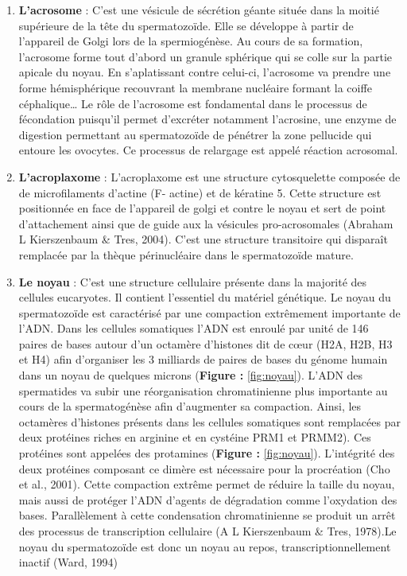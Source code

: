 \documentclass[12pt,twoside]{reedthesis}
\providecommand{\tightlist}{%
  \setlength{\itemsep}{0pt}\setlength{\parskip}{0pt}}
\theoremstyle{definition}
\theoremstyle{definition}
\theoremstyle{remark}
\begin{document}
  \begin{enumerate}
  \def\labelenumi{\arabic{enumi}.}
  \tightlist
  \item
    \textbf{L'acrosome} : C'est une vésicule de sécrétion géante située
    dans la moitié supérieure de la tête du spermatozoïde. Elle se
    développe à partir de l'appareil de Golgi lors de la spermiogénèse. Au
    cours de sa formation, l'acrosome forme tout d'abord un granule
    sphérique qui se colle sur la partie apicale du noyau. En
    s'aplatissant contre celui-ci, l'acrosome va prendre une forme
    hémisphérique recouvrant la membrane nucléaire formant la coiffe
    céphalique\ldots{} Le rôle de l'acrosome est fondamental dans le
    processus de fécondation puisqu'il permet d'excréter notamment
    l'acrosine, une enzyme de digestion permettant au spermatozoïde de
    pénétrer la zone pellucide qui entoure les ovocytes. Ce processus de
    relargage est appelé réaction acrosomal.\\
  \item
    \textbf{L'acroplaxome} : L'acroplaxome est une structure cytosquelette
    composée de de microfilaments d'actine (F- actine) et de kératine 5.
    Cette structure est positionnée en face de l'appareil de golgi et
    contre le noyau et sert de point d'attachement ainsi que de guide aux
    la vésicules pro-acrosomales (Abraham L Kierszenbaum \& Tres, 2004).
    C'est une structure transitoire qui disparaît remplacée par la thèque
    périnucléaire dans le spermatozoïde mature.\\
  \item
    \textbf{Le noyau} : C'est une structure cellulaire présente dans la
    majorité des cellules eucaryotes. Il contient l'essentiel du matériel
    génétique. Le noyau du spermatozoïde est caractérisé par une
    compaction extrêmement importante de l'ADN. Dans les cellules
    somatiques l'ADN est enroulé par unité de 146 paires de bases autour
    d'un octamère d'histones dit de cœur (H2A, H2B, H3 et H4) afin
    d'organiser les 3 milliards de paires de bases du génome humain dans
    un noyau de quelques microns (\textbf{Figure : }\ref{fig:noyau}).
    L'ADN des spermatides va subir une réorganisation chromatinienne plus
    importante au cours de la spermatogénèse afin d'augmenter sa
    compaction. Ainsi, les octamères d'histones présents dans les cellules
    somatiques sont remplacées par deux protéines riches en arginine et en
    cystéine PRM1 et PRMM2). Ces protéines sont appelées des protamines
    (\textbf{Figure : }\ref{fig:noyau}). L'intégrité des deux protéines
    composant ce dimère est nécessaire pour la procréation (Cho et al.,
    2001). Cette compaction extrême permet de réduire la taille du noyau,
    mais aussi de protéger l'ADN d'agents de dégradation comme l'oxydation
    des bases. Parallèlement à cette condensation chromatinienne se
    produit un arrêt des processus de transcription cellulaire (A L
    Kierszenbaum \& Tres, 1978).Le noyau du spermatozoïde est donc un
    noyau au repos, transcriptionnellement inactif (Ward, 1994)
  \end{enumerate}
  
\end{document}
